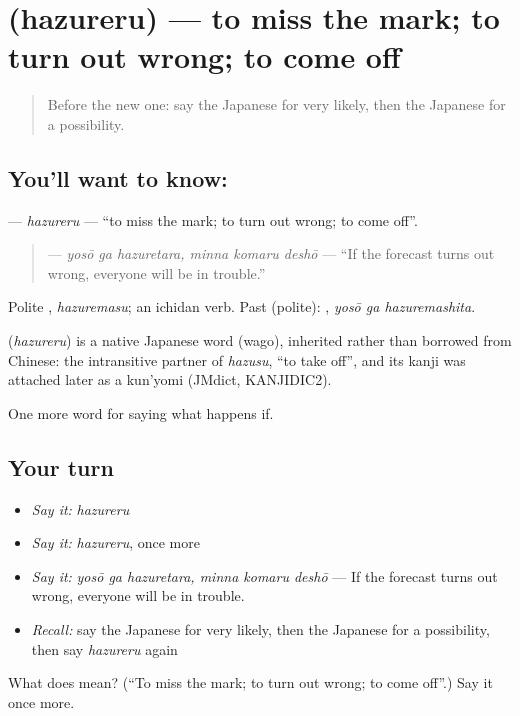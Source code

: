 \section[\texorpdfstring{\ja{はずれる} (hazureru)}{はずれる (hazureru)}]{ (hazureru) — to miss the mark; to turn out wrong; to come off}

\label{lesson:JA-C355-hazureru}



\begin{quote}
Before the new one: say the Japanese for very likely, then the Japanese for a possibility.
\end{quote}

\subsection*{You'll want to know: }
\textbf{} — \emph{hazureru} — \textquotedblleft{}to miss the mark; to turn out wrong; to come off\textquotedblright{}.

\begin{quote}
\textbf{  } — \emph{yosō ga hazuretara, minna komaru deshō} — \textquotedblleft{}If the forecast turns out wrong, everyone will be in trouble.\textquotedblright{}
\end{quote}

Polite \textbf{}, \emph{hazuremasu}; an ichidan verb. Past (polite): \textbf{ }, \emph{yosō ga hazuremashita}.

\begin{cousinweb}
\textbf{} (\emph{hazureru}) is a native Japanese word (wago), inherited rather than borrowed from Chinese: the intransitive partner of \emph{hazusu}, \textquotedblleft{}to take off\textquotedblright{}, and its kanji was attached later as a kun'yomi (JMdict, KANJIDIC2).
\end{cousinweb}

\begin{grammarlens}[title={What you've built}]
One more word for saying what happens if.
\end{grammarlens}

\subsection*{Your turn}
\begin{itemize}
\raggedright
  \item \emph{Say it:} \emph{hazureru}
  \item \emph{Say it:} \emph{hazureru}, once more
  \item \emph{Say it:} \emph{yosō ga hazuretara, minna komaru deshō} — If the forecast turns out wrong, everyone will be in trouble.
  \item \emph{Recall:} say the Japanese for very likely, then the Japanese for a possibility, then say \emph{hazureru} again
\end{itemize}

\begin{tcolorbox}[breakable,colback=teal!4,colframe=teal!35!black,title={Before you move on}]
What does  mean? (\textquotedblleft{}To miss the mark; to turn out wrong; to come off\textquotedblright{}.) Say it once more.
\end{tcolorbox}
